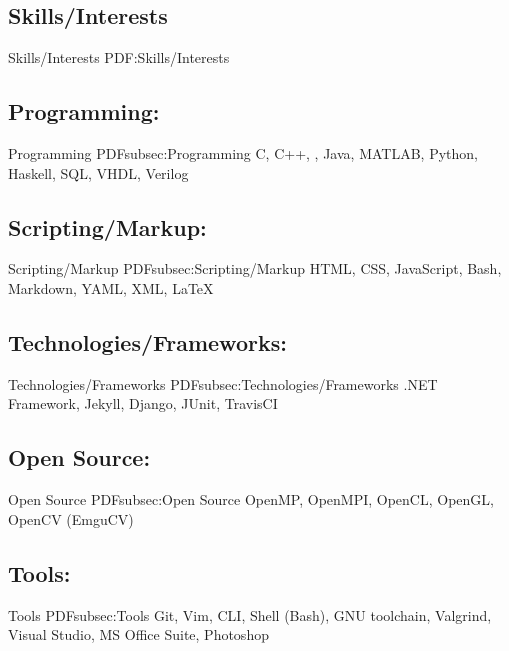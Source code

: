 \documentclass[a4paper,10pt,oneside]{article}
\begin{document}
\begin{body}



\section
{Skills/Interests}
{Skills/Interests}
{PDF:Skills/Interests}
\subsection
{Programming:}
{Programming}
{PDFsubsec:Programming}
C, C++, \Csharp, Java, MATLAB, Python, Haskell, SQL, VHDL, Verilog
\vspace{15pt}
\subsection
{Scripting/Markup:}
{Scripting/Markup}
{PDFsubsec:Scripting/Markup}
HTML, CSS, JavaScript, Bash, Markdown, YAML, XML, \LaTeX
\vspace{15pt}
\subsection
{Technologies/Frameworks:}
{Technologies/Frameworks}
{PDFsubsec:Technologies/Frameworks}
.NET Framework, Jekyll, Django, JUnit, TravisCI
\vspace{15pt}
\subsection
{Open Source:}
{Open Source}
{PDFsubsec:Open Source}
OpenMP, OpenMPI, OpenCL, OpenGL, OpenCV (EmguCV)
\vspace{15pt}
\subsection
{Tools:}
{Tools}
{PDFsubsec:Tools}
Git, Vim, CLI, Shell (Bash), GNU toolchain, Valgrind, Visual Studio, MS Office Suite, Photoshop
\vspace{15pt}

\end{body}
\end{document}
